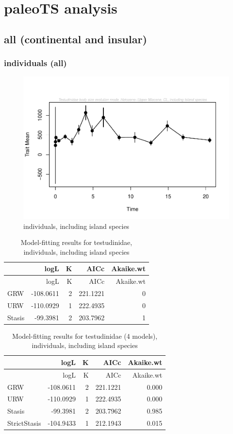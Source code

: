\documentclass[]{article}
\begin{document}
\newpage

\section{paleoTS analysis}\label{paleots-analysis}

\subsection{all (continental and
insular)}\label{all-continental-and-insular}

\subsubsection{individuals (all)}\label{individuals-all}

\begin{figure}[htbp]
\centering
\includegraphics{MA_JJ_files/figure-latex/paleoTS plot-1.pdf}
\caption{individuals, including island species}
\end{figure}

\begin{longtable}[]{@{}lrrrr@{}}
\caption{Model-fitting results for testudinidae, individuals, including
island species}\tabularnewline
\toprule
& logL & K & AICc & Akaike.wt\tabularnewline
\midrule
\endfirsthead
\toprule
& logL & K & AICc & Akaike.wt\tabularnewline
\midrule
\endhead
GRW & -108.0611 & 2 & 221.1221 & 0\tabularnewline
URW & -110.0929 & 1 & 222.4935 & 0\tabularnewline
Stasis & -99.3981 & 2 & 203.7962 & 1\tabularnewline
\bottomrule
\end{longtable}

\begin{longtable}[]{@{}lrrrr@{}}
\caption{Model-fitting results for testudinidae (4 models), individuals,
including island species}\tabularnewline
\toprule
& logL & K & AICc & Akaike.wt\tabularnewline
\midrule
\endfirsthead
\toprule
& logL & K & AICc & Akaike.wt\tabularnewline
\midrule
\endhead
GRW & -108.0611 & 2 & 221.1221 & 0.000\tabularnewline
URW & -110.0929 & 1 & 222.4935 & 0.000\tabularnewline
Stasis & -99.3981 & 2 & 203.7962 & 0.985\tabularnewline
StrictStasis & -104.9433 & 1 & 212.1943 & 0.015\tabularnewline
\bottomrule
\end{longtable}
\end{document}
